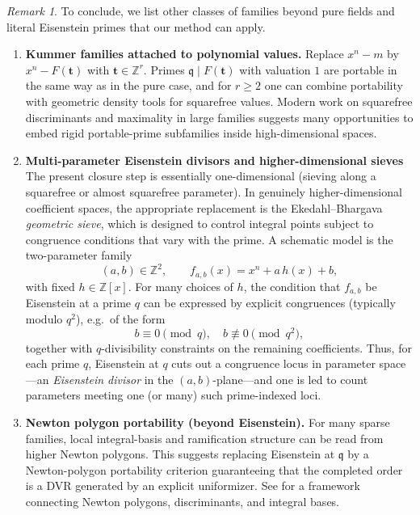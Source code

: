 \documentclass[11pt,letterpaper]{amsart}
\theoremstyle{plain}
\theoremstyle{definition}
\theoremstyle{remark}
\newtheorem{remark}[theorem]{Remark}
\theoremstyle{plain}
\begin{document}
\begin{remark}
To conclude, we list other classes of families beyond pure fields and literal Eisenstein primes that our method can apply.
\begin{enumerate}

\item \textbf{Kummer families attached to polynomial values.}
Replace $x^n-m$ by $x^n-F(\mathbf{t})$ with $\mathbf{t}\in\mathbb{Z}^r$.
Primes $\mathfrak{q}\mid F(\mathbf{t})$ with valuation $1$ are portable in the same way as in the pure case,
and for $r\ge 2$ one can combine portability with geometric density tools for squarefree values.
Modern work on squarefree discriminants and maximality in large families suggests many opportunities
to embed rigid portable-prime subfamilies inside high-dimensional spaces.



\item \textbf{Multi-parameter Eisenstein divisors and higher-dimensional sieves} The present closure step is essentially one-dimensional (sieving along a squarefree or almost squarefree
parameter). In genuinely higher-dimensional coefficient spaces, the appropriate replacement is the
Ekedahl--Bhargava \emph{geometric sieve}, which is designed to control integral points subject to
congruence conditions that vary with the prime. A schematic model is the two-parameter family
\[
(a,b)\in\mathbb{Z}^2,\qquad
f_{a,b}(x)=x^n + a\,h(x) + b,
\]
with fixed $h\in\mathbb{Z}[x]$. For many choices of $h$, the condition that $f_{a,b}$ be Eisenstein at a prime $q$
can be expressed by explicit congruences (typically modulo $q^2$), e.g.\ of the form
\[
b\equiv 0 \pmod q,\quad b\not\equiv 0 \pmod{q^2},
\]
together with $q$-divisibility constraints on the remaining coefficients. Thus, for each prime $q$, Eisenstein at $q$ cuts out a congruence locus in parameter space---an
\emph{Eisenstein divisor} in the $(a,b)$-plane---and one is led to count parameters meeting one (or many) such prime-indexed loci.

\item \textbf{Newton polygon portability (beyond Eisenstein).}
For many sparse families, local integral-basis and ramification structure can be read from higher Newton polygons. This suggests replacing Eisenstein at $\mathfrak{q}$ by a Newton-polygon portability criterion guaranteeing that the completed order is a DVR generated by an explicit uniformizer.
See \cite{GMN2015} for a framework connecting Newton polygons, discriminants, and integral bases.

\end{enumerate}
\end{remark}





\end{document}
